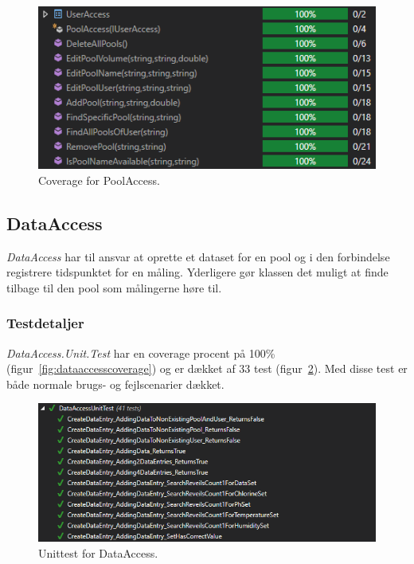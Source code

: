 \begin{figure}[h]
	\centering
	\includegraphics[width=0.7\linewidth]{figs/test/poolaccesscoverage}
	\caption{Coverage for PoolAccess.}
	\label{fig:poolaccesscoverage}
\end{figure}

\subsection{DataAccess}
\textit{DataAccess} har til ansvar at oprette et dataset for en pool og i den forbindelse registrere tidspunktet for en måling. Yderligere gør klassen det muligt at finde tilbage til den pool som målingerne høre til.

\subsubsection{Testdetaljer}
\textit{DataAccess.Unit.Test} har en coverage procent på 100\% (figur~\ref{fig:dataaccesscoverage}) og er dækket af 33 test (figur~\ref{fig:dataaccessunittest}). Med disse test er både normale brugs- og fejlscenarier dækket.

\begin{figure}[h]
	\centering
	\includegraphics[width=0.9\linewidth]{figs/test/dataaccessunittest}
	\caption{Unittest for DataAccess.}
	\label{fig:dataaccessunittest}
\end{figure}

